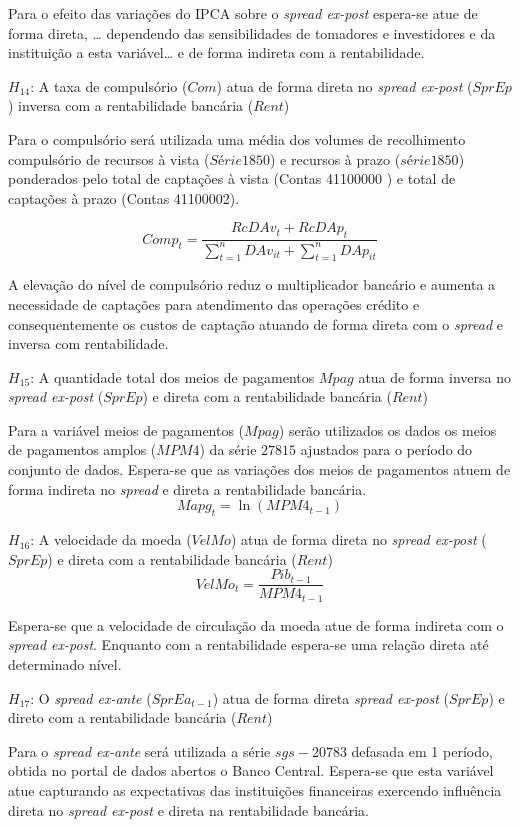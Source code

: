 \documentclass[12pt,12pt,openright,oneside,a4paper,chapter=TITLE,section=TITLE,subsection=TITLE,subsubsection=TITLE,english,french,spanish,portugues,sumario=tradicional]{abntex2}
\begin{document}
Para o efeito das variações do IPCA sobre o \emph{spread ex-post} espera-se atue de forma direta, \ldots{} dependendo das sensibilidades de tomadores e investidores e da instituição a esta variável\ldots{} e de forma indireta com a rentabilidade.

\(H_{14}\): A taxa de compulsório (\(Com\)) atua de forma direta no \emph{spread ex-post} (\(SprEp\)) inversa com a rentabilidade bancária (\(Rent\))

Para o compulsório será utilizada uma média dos volumes de recolhimento compulsório de recursos à vista (\(Série 1850\)) e recursos à prazo (\(série 1850\)) ponderados pelo total de captações à vista (Contas 41100000 ) e total de captações à prazo (Contas 41100002).

\[
Comp_{t} = \frac{RcDAv_{t} + RcDAp_{t}}{\sum_{t=1}^{n}DAv_{it} + \sum_{t=1}^{n}DAp_{it}}
\]

A elevação do nível de compulsório reduz o multiplicador bancário e aumenta a necessidade de captações para atendimento das operações crédito e consequentemente os custos de captação atuando de forma direta com o \emph{spread} e inversa com rentabilidade.

\(H_{15}\): A quantidade total dos meios de pagamentos \(Mpag\) atua de forma inversa no \emph{spread ex-post} (\(SprEp\)) e direta com a rentabilidade bancária (\(Rent\))

Para a variável meios de pagamentos (\(Mpag\)) serão utilizados os dados os meios de pagamentos amplos (\(MPM4\)) da série \(27815\) ajustados para o período do conjunto de dados. Espera-se que as variações dos meios de pagamentos atuem de forma indireta no \emph{spread} e direta a rentabilidade bancária.
\[
Mapg_{t} = \ln(MPM4_{t-1})
\]

\(H_{16}\): A velocidade da moeda (\(VelMo\)) atua de forma direta no \emph{spread ex-post} (\(SprEp\)) e direta com a rentabilidade bancária (\(Rent\))
\[
VelMo_{t} = \frac{Pib_{t-1}}{MPM4_{t-1}}
\]

Espera-se que a velocidade de circulação da moeda atue de forma indireta com o \emph{spread ex-post}. Enquanto com a rentabilidade espera-se uma relação direta até determinado nível.

\(H_{17}\): O \emph{spread ex-ante} (\(SprEa_{t-1}\)) atua de forma direta \emph{spread ex-post} (\(SprEp\)) e direto com a rentabilidade bancária (\(Rent\))

Para o \emph{spread ex-ante} será utilizada a série \(sgs-20783\) defasada em 1 período, obtida no portal de dados abertos o Banco Central. Espera-se que esta variável atue capturando as expectativas das instituições financeiras exercendo influência direta no \emph{spread ex-post} e direta na rentabilidade bancária.
\end{document}
